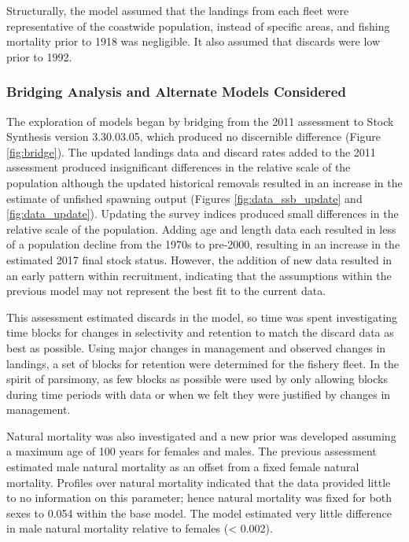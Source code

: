 \documentclass[12pt,]{article}
\begin{document}
Structurally, the model assumed that the landings from each fleet were
representative of the coastwide population, instead of specific areas,
and fishing mortality prior to 1918 was negligible. It also assumed that
discards were low prior to 1992.

\subsubsection{Bridging Analysis and Alternate Models
Considered}\label{bridging-analysis-and-alternate-models-considered}

The exploration of models began by bridging from the 2011 assessment to
Stock Synthesis version 3.30.03.05, which produced no discernible
difference (Figure \ref{fig:bridge}). The updated landings data and
discard rates added to the 2011 assessment produced insignificant
differences in the relative scale of the population although the updated
historical removals resulted in an increase in the estimate of unfished
spawning output (Figures \ref{fig:data_ssb_update} and
\ref{fig:data_update}). Updating the survey indices produced small
differences in the relative scale of the population. Adding age and
length data each resulted in less of a population decline from the 1970s
to pre-2000, resulting in an increase in the estimated 2017 final stock
status. However, the addition of new data resulted in an early pattern
within recruitment, indicating that the assumptions within the previous
model may not represent the best fit to the current data.

This assessment estimated discards in the model, so time was spent
investigating time blocks for changes in selectivity and retention to
match the discard data as best as possible. Using major changes in
management and observed changes in landings, a set of blocks for
retention were determined for the fishery fleet. In the spirit of
parsimony, as few blocks as possible were used by only allowing blocks
during time periods with data or when we felt they were justified by
changes in management.

Natural mortality was also investigated and a new prior was developed
assuming a maximum age of 100 years for females and males. The previous
assessment estimated male natural mortality as an offset from a fixed
female natural mortality. Profiles over natural mortality indicated that
the data provided little to no information on this parameter; hence
natural mortality was fixed for both sexes to 0.054 within the base
model. The model estimated very little difference in male natural
mortality relative to females (\textless{} 0.002).
\end{document}
